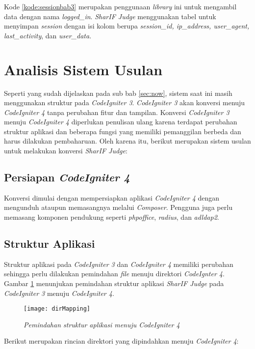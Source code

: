 Kode \ref{kode:sessionbab3} merupakan penggunaan \textit{library} ini untuk mengambil data dengan nama \textit{logged\_in}. \textit{SharIF Judge} menggunakan tabel untuk menyimpan \textit{session} dengan isi kolom berupa \textit{session\_id, ip\_address, user\_agent, last\_activity}, dan \textit{user\_data}.

\section{Analisis Sistem Usulan}
Seperti yang sudah dijelaskan pada sub bab \ref{sec:now}, sistem saat ini masih menggunakan struktur pada \textit{CodeIgniter 3}. \textit{CodeIgniter 3} akan konversi menuju \textit{CodeIgniter 4} tanpa perubahan fitur dan tampilan. Konversi \textit{CodeIgniter 3} menuju \textit{CodeIgniter 4} diperlukan penulisan ulang karena terdapat perubahan struktur aplikasi dan beberapa fungsi yang memiliki pemanggilan berbeda dan harus dilakukan pembaharuan. Oleh karena itu, berikut merupakan sistem usulan untuk melakukan konversi \textit{SharIF Judge}:
\subsection{Persiapan \textit{CodeIgniter 4}} Konversi dimulai dengan mempersiapkan aplikasi \textit{CodeIgniter 4} dengan mengunduh ataupun memasangnya melalui \textit{Composer}. Pengguna juga perlu memasang komponen pendukung seperti \textit{phpoffice}, \textit{radius}, dan \textit{adldap2}.

\subsection{Struktur Aplikasi}
Struktur aplikasi pada \textit{CodeIgniter 3} dan \textit{CodeIgniter 4} memiliki perubahan sehingga perlu dilakukan pemindahan \textit{file} menuju direktori \textit{CodeIgnter 4}. Gambar \ref{fig:dirMapping} menunjukan pemindahan struktur aplikasi \textit{SharIF Judge} pada \textit{CodeIgniter 3} menuju \textit{CodeIgniter 4}.
\begin{figure}[H]
	\centering  
	\texttt{[image: dirMapping]}  
	\caption[Pemindahan struktur aplikasi menuju \textit{CodeIgniter 4}]{\textit{Pemindahan struktur aplikasi menuju \textit{CodeIgniter 4}}} 
	\label{fig:dirMapping} 
\end{figure} 

Berikut merupakan rincian direktori yang dipindahkan menuju \textit{CodeIgniter 4}:
